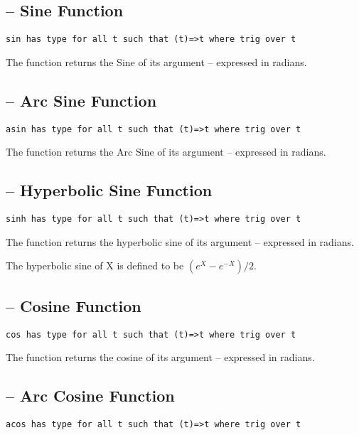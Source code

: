 \subsection{ -- Sine Function}
\begin{lstlisting}
sin has type for all t such that (t)=>t where trig over t
\end{lstlisting}

The  function returns the Sine of its argument -- expressed in radians.

\subsection{ -- Arc Sine Function}
\begin{lstlisting}
asin has type for all t such that (t)=>t where trig over t
\end{lstlisting}

The  function returns the Arc Sine of its argument -- expressed in radians.

\subsection{ -- Hyperbolic Sine Function}
\begin{lstlisting}
sinh has type for all t such that (t)=>t where trig over t
\end{lstlisting}

The  function returns the hyperbolic sine of its argument -- expressed in radians.

The hyperbolic sine of X is defined to be $(e^X - e^{-X})/2$.

\subsection{ -- Cosine Function}
\begin{lstlisting}
cos has type for all t such that (t)=>t where trig over t
\end{lstlisting}

The  function returns the cosine of its argument -- expressed in radians.

\subsection{ -- Arc Cosine Function}
\begin{lstlisting}
acos has type for all t such that (t)=>t where trig over t
\end{lstlisting}

